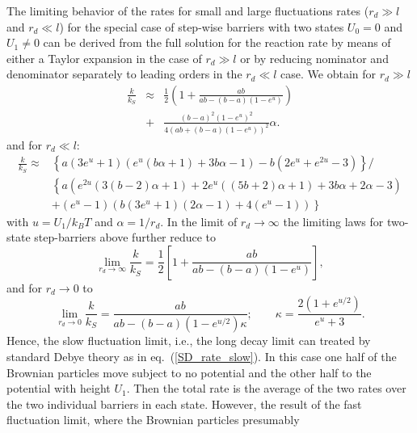 \documentclass[preprint,superscriptaddress]{revtex4-1}
\begin{document}
The limiting behavior of the rates for small and large fluctuations rates ($r_d\gg l $ and $r_d \ll l$) for the special case of step-wise barriers with two states
$U_0=0$ and $U_1 \neq 0$ can be derived from the full solution for the reaction rate by means of either a Taylor expansion in the case of $r_d \gg l$ or by reducing nominator and denominator separately to leading orders in the $r_d \ll l$ case. 
We obtain for $r_d \gg l$
\begin{eqnarray}
    \frac{k}{k_{S}} &\approx&  \frac{1}{2}\left(1+ \frac{ab}{ab-(b-a) \left(1-e^u\right)}\right) \nonumber \\ 
     &+& \frac{  (b-a)^2\left(1-e^u\right)^2}{4 \left(ab + (b-a)(1-e^u)\right)^2} \alpha.
    \label{ksa}
\end{eqnarray}
and for $r_d \ll l $:
\begin{align}
    \frac{k}{k_{S}} \approx &\left\{a \left(3 e^u+1\right) \left(e^u (b \alpha+1)+3 b \alpha-1\right)-b \left(2 e^u+e^{2 u}-3\right)\right\} / \nonumber \\
                          &\left\{a \left(e^{2 u} (3 (b-2) \alpha+1)+2 e^u ((5 b+2) \alpha+1)+3 b \alpha+2 \alpha-3\right) \right.  \nonumber \\
                          & \left. +\left(e^u-1\right) \left(b \left(3 e^u+1\right) (2 \alpha-1)+4 \left(e^u-1\right)\right) \right\}
    \label{kla}
\end{align}
with $u = U_1/k_B T$ and $\alpha = 1/r_d$. In the limit of $r_d \rightarrow \infty$ the limiting laws for two-state step-barriers above further reduce to
\begin{equation}
    \lim_{r_d \rightarrow \infty}\frac{k}{k_{S}} = \frac{1}{2} \left[ 1 + \frac{ab}{ab - \left( b-a \right)\left(1 - e^u \right)} \right],
    \label{two_state_K_slow}
\end{equation}
and for $r_d \to 0$ to 
\begin{equation}
    \lim_{r_d \rightarrow 0} \frac{k}{k_S} = \frac{ab}{ab - (b-a)(1-e^{u/2}) \kappa}; \qquad \kappa = \frac{2(1+e^{u/2})}{e^u + 3}.
    \label{K_fast_limit_2}
\end{equation}
Hence, the slow fluctuation limit, i.e., the long decay limit can treated by standard Debye theory as in eq.~(\ref{SD_rate_slow}). 
In this case one half of the Brownian particles move subject to no potential and the other half to the potential with height $U_1$. 
Then the total rate is the average of the two rates over the two individual barriers in each state. 
However, the result of the fast fluctuation limit, where the Brownian particles presumably 
\end{document}
